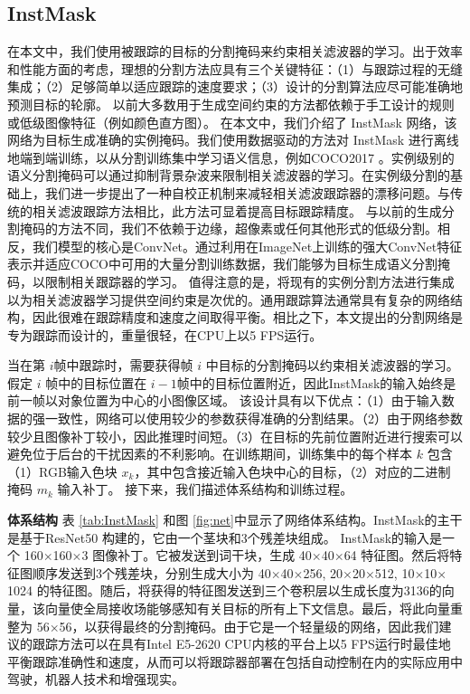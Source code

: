 \subsection{InstMask}
\label{sec:InstMask}
在本文中，我们使用被跟踪的目标的分割掩码来约束相关滤波器的学习。出于效率和性能方面的考虑，理想的分割方法应具有三个关键特征：（1）与跟踪过程的无缝集成；（2）足够简单以适应跟踪的速度要求；（3）设计的分割算法应尽可能准确地预测目标的轮廓。
以前大多数用于生成空间约束的方法都依赖于手工设计的规则或低级图像特征（例如颜色直方图）。
在本文中，我们介绍了 InstMask 网络，该网络为目标生成准确的实例掩码。我们使用数据驱动的方法对 InstMask 进行离线地端到端训练，以从分割训练集中学习语义信息，例如COCO2017 \cite{COCO}。实例级别的语义分割掩码可以通过抑制背景杂波来限制相关滤波器的学习。在实例级分割的基础上，我们进一步提出了一种自校正机制来减轻相关滤波跟踪器的漂移问题。与传统的相关滤波跟踪方法相比，此方法可显着提高目标跟踪精度。
与以前的生成分割掩码的方法不同，我们不依赖于边缘，超像素或任何其他形式的低级分割。相反，我们模型的核心是ConvNet。通过利用在ImageNet上训练的强大ConvNet特征表示并适应COCO中可用的大量分割训练数据，我们能够为目标生成语义分割掩码，以限制相关跟踪器的学习。
值得注意的是，将现有的实例分割方法进行集成以为相关滤波器学习提供空间约束是次优的。通用跟踪算法通常具有复杂的网络结构，因此很难在跟踪精度和速度之间取得平衡。相比之下，本文提出的分割网络是专为跟踪而设计的，重量很轻，在CPU上以5 FPS运行。

当在第 $i$帧中跟踪时，需要获得帧 $i$ 中目标的分割掩码以约束相关滤波器的学习。
假定 $i$ 帧中的目标位置在 $i-1$帧中的目标位置附近，因此InstMask的输入始终是前一帧以对象位置为中心的小图像区域。
该设计具有以下优点：（1）由于输入数据的强一致性，网络可以使用较少的参数获得准确的分割结果。（2）由于网络参数较少且图像补丁较小，因此推理时间短。（3）在目标的先前位置附近进行搜索可以避免位于后台的干扰因素的不利影响。在训练期间，训练集中的每个样本 $k$ 包含（1）RGB输入色块 $x_k$，其中包含接近输入色块中心的目标，（2）对应的二进制掩码 $m_{k}$ 输入补丁。
接下来，我们描述体系结构和训练过程。

\textbf{体系结构} 表 \ref{tab:InstMask} 和图 \ref{fig:net}中显示了网络体系结构。InstMask的主干是基于ResNet50 \cite{He2016DeepRL}构建的，它由一个茎块和3个残差块组成。
InstMask的输入是一个 160$\times$160$\times$3 图像补丁。它被发送到词干块，生成 40$\times$40$\times$64 特征图。然后将特征图顺序发送到3个残差块，分别生成大小为 40$\times$40$\times$256, 20$\times$20$\times$512, 10$\times$10$\times$1024 的特征图。随后，将获得的特征图发送到三个卷积层以生成长度为3136的向量，该向量使全局接收场能够感知有关目标的所有上下文信息。最后，将此向量重整为 56$\times$56，以获得最终的分割掩码。由于它是一个轻量级的网络，因此我们建议的跟踪方法可以在具有Intel E5-2620 CPU内核的平台上以5 FPS运行时最佳地平衡跟踪准确性和速度，从而可以将跟踪器部署在包括自动控制在内的实际应用中驾驶，机器人技术和增强现实。

